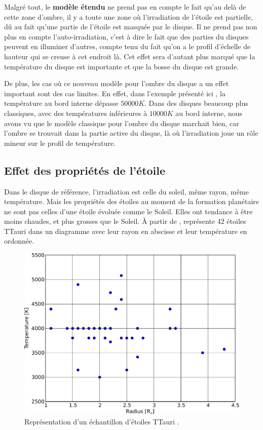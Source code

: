 Malgré tout, le \textbf{modèle étendu} ne prend pas en compte le fait qu'au delà de cette zone d'ombre, il y a toute une zone où l'irradiation de l'étoile est partielle, dû au fait qu'une partie de l'étoile est masquée par le disque. Il ne prend pas non plus en compte l'auto-irradiation, c'est à dire le fait que des parties du disques peuvent en illuminer d'autres, compte tenu du fait qu'on a le profil d'échelle de hauteur qui se creuse à cet endroit là. Cet effet sera d'autant plus marqué que la température du disque est importante et que la bosse du disque est grande. 

De plus, les cas où ce nouveau modèle pour l'ombre du disque a un effet important sont des cas limites. En effet, dans l'exemple présenté ici , la température au bord interne dépasse $50 000\unit{K}$. Dans des disques beaucoup plus classiques, avec des températures inférieures à $10 000\unit{K}$ au bord interne, nous avons vu que le modèle classique pour l'ombre du disque marchait bien, car l'ombre se trouvait dans la partie active du disque, là où l'irradiation joue un rôle mineur sur le profil de température.

\subsection{Effet des propriétés de l'étoile}
Dans le disque de référence, l'irradiation est celle du soleil, même rayon, même température. Mais les propriétés des étoiles au moment de la formation planétaire ne sont pas celles d'une étoile évoluée comme le Soleil. Elles ont tendance à être moins chaudes, et plus grosses que le Soleil. À partir de \cite[Table 2]{hartigan1995disk},  représente 42 étoiles TTauri dans un diagramme avec leur rayon en abscisse et leur température en ordonnée. 

\begin{figure}[htbp]
\centering
\includegraphics[width=0.5\linewidth]{figure/TTauri_sample.pdf}
\caption{Représentation d'un échantillon d'étoiles TTauri \citep{hartigan1995disk}. }\label{fig:TTauri_sample}
\end{figure}

